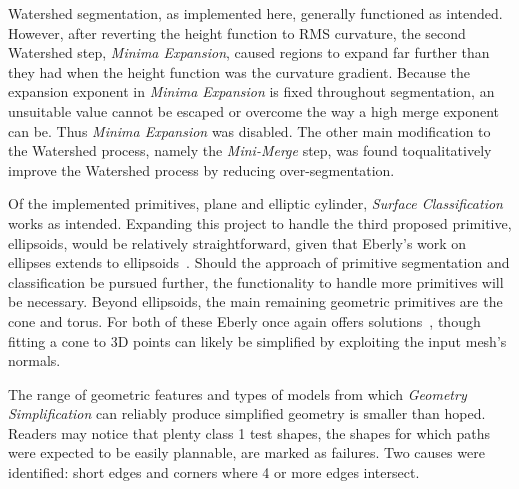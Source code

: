 Watershed segmentation, as implemented here, generally functioned as intended.
However, after reverting the height function to RMS curvature, the second Watershed step, \textit{Minima Expansion}, caused regions to expand far further than they had when the height function was the curvature gradient.
Because the expansion exponent in \textit{Minima Expansion} is fixed throughout segmentation, an unsuitable value cannot be escaped or overcome the way a high merge exponent can be.
Thus \textit{Minima Expansion} was disabled.
The other main modification to the Watershed process, namely the \textit{Mini-Merge} step, was found toqualitatively improve the Watershed process by reducing over-segmentation.

Of the implemented primitives, plane and elliptic cylinder, \textit{Surface Classification} works as intended.
Expanding this project to handle the third proposed primitive, ellipsoids, would be relatively straightforward, given that Eberly's work on ellipses extends to ellipsoids~\cite{GeoTools_pt_to_ellipse}.
Should the approach of primitive segmentation and classification be pursued further, the functionality to handle more primitives will be necessary.
Beyond ellipsoids, the main remaining geometric primitives are the cone and torus.
For both of these Eberly once again offers solutions~\cite{GeoTools_least_squares_fitting}, though fitting a cone to 3D points can likely be simplified by exploiting the input mesh's normals.

The range of geometric features and types of models from which \textit{Geometry Simplification} can reliably produce simplified geometry is smaller than hoped.
Readers may notice that plenty class 1 test shapes, the shapes for which paths were expected to be easily plannable, are marked as failures.
Two causes were identified: short edges and corners where 4 or more edges intersect.

